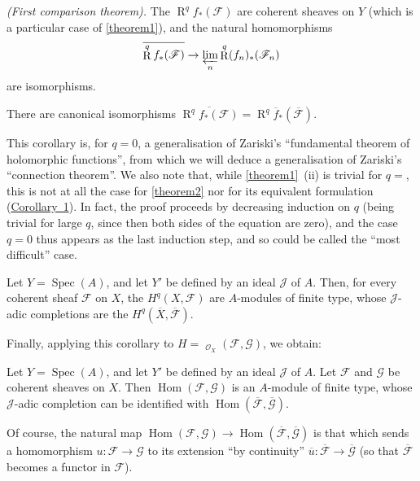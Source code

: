 \documentclass{article}
\theoremstyle{plain}
\newenvironment{theorem}[1]
  {\renewcommand\theinnercustomtheorem{#1}\innercustomtheorem}
  {\endinnercustomtheorem}
\newenvironment{corollary}[1]
  {\renewcommand\theinnercustomcorollary{#1}\innercustomcorollary}
  {\endinnercustomcorollary}
\newcommand{\sh}{\mathscr}
\DeclareMathOperator{\Spec}{Spec}
\DeclareMathOperator{\RR}{R}
\DeclareMathOperator{\Hom}{Hom}
\DeclareMathOperator{\shHom}{\underline{\Hom}}
\begin{document}
\begin{theorem}{2}
\label{theorem2}
  \emph{(First comparison theorem).}
  The $\RR^q f_*(\sh{F})$ are coherent sheaves on $Y$ (which is a particular case of \cref{theorem1}), and the natural homomorphisms
  \[
    \overline{\RR^q f_*(\sh{F})} \to \varprojlim_n \RR^q (f_n)_*(\sh{F}_n)
  \]
  are isomorphisms.
\end{theorem}

\begin{corollary}{1}
\label{theorem2corollary1}
  There are canonical isomorphisms $\overline{\RR^q f_*(\sh{F})} = \RR^q\overline{f}_*(\overline{\sh{F}})$.
\end{corollary}

This corollary is, for $q=0$, a generalisation of Zariski's ``fundamental theorem of holomorphic functions'', from which we will deduce a generalisation of Zariski's ``connection theorem''.
We also note that, while \cref{theorem1}~(ii) is trivial for $q=$, this is not at all the case for \cref{theorem2} nor for its equivalent formulation (\hyperref[theorem2corollary1]{Corollary~1}).
In fact, the proof proceeds by decreasing induction on $q$ (being trivial for large $q$, since then both sides of the equation are zero), and the case $q=0$ thus appears as the last induction step, and so could be called the ``most difficult'' case.

\begin{corollary}{2}
\label{theorem2corollary2}
  Let $Y=\Spec(A)$, and let $Y'$ be defined by an ideal $\sh{J}$ of $A$.
  Then, for every coherent sheaf $\sh{F}$ on $X$, the $H^q(X,\sh{F})$ are $A$-modules of finite type, whose $\sh{J}$-adic completions are the $H^q(\overline{X},\overline{\sh{F}})$.
\end{corollary}

Finally, applying this corollary to $H=\shHom_{\sh{O}_X}(\sh{F},\sh{G})$, we obtain:

\begin{corollary}{3}
\label{theorem2corollary3}
  Let $Y=\Spec(A)$, and let $Y'$ be defined by an ideal $\sh{J}$ of $A$.
  Let $\sh{F}$ and $\sh{G}$ be coherent sheaves on $X$.
  Then $\Hom(\sh{F},\sh{G})$ is an $A$-module of finite type, whose $\sh{J}$-adic completion can be identified with $\Hom(\overline{\sh{F}},\overline{\sh{G}})$.
\end{corollary}

Of course, the natural map $\Hom(\sh{F},\sh{G})\to\Hom(\overline{\sh{F}},\overline{\sh{G}})$ is that which sends a homomorphism $u\colon\sh{F}\to\sh{G}$ to its extension ``by continuity'' $\overline{u}\colon\overline{\sh{F}}\to\overline{\sh{G}}$ (so that $\overline{\sh{F}}$ becomes a functor in $\sh{F}$).
\end{document}
